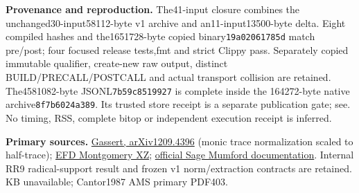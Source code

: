 \documentclass[10pt]{article}
\begin{document}
\textbf{Provenance and reproduction.}
The41-input closure combines the unchanged30-input58112-byte v1 archive and
an11-input13500-byte delta. Eight compiled hashes and the1651728-byte copied
binary\texttt{19a02061785d} match pre/post; four focused release tests,fmt and
strict Clippy pass. Separately copied immutable qualifier, create-new raw
output, distinct BUILD/PRECALL/POSTCALL and actual transport collision are
retained. The4581082-byte JSONL\texttt{7b59c8519927} is complete inside the
164272-byte native archive\texttt{8f7b6024a389}. Its trusted store receipt
is a separate publication gate; see. No timing, RSS,
complete bitop or independent execution receipt is inferred.

\textbf{Primary sources.}
\href{https://arxiv.org/abs/1209.4396}{Gassert, arXiv1209.4396}
(monic trace normalization scaled to half-trace);
\href{https://hyperelliptic.org/EFD/g1p/auto-montgom-xz.html}{EFD Montgomery XZ};
\href{https://doc.sagemath.org/html/en/reference/arithmetic_curves/sage/schemes/hyperelliptic_curves/jacobian_morphism.html}{official Sage Mumford documentation}.
Internal RR9 radical-support result and frozen v1 norm/extraction contracts
are retained. KB unavailable; Cantor1987 AMS primary PDF403.
\end{document}
